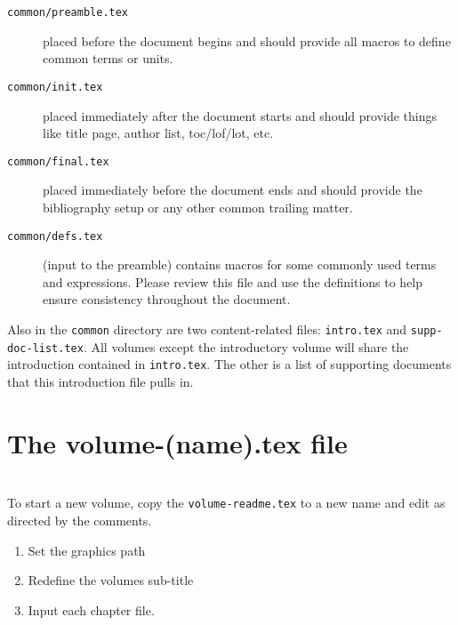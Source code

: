\begin{description}
\item[\texttt{common/preamble.tex}] placed before the document begins and should provide all macros to define common terms or units.
\item[\texttt{common/init.tex}] placed immediately after the document starts and should provide things like title page, author list, toc/lof/lot, etc.
\item[\texttt{common/final.tex}] placed immediately before the document ends and should provide the bibliography setup or any other common trailing matter.
\item[\texttt{common/defs.tex}] (input to the preamble) contains macros for some commonly 
used terms and expressions. Please review this file and use the definitions to help ensure consistency
throughout the document.
\end{description}

Also in the \texttt{common} directory are two content-related files: \texttt{intro.tex} and 
\texttt{supp-doc-list.tex}.  All volumes except the introductory volume will share the introduction
contained in \texttt{intro.tex}.  The other is a list of supporting documents that this
introduction file pulls in.

\section{The volume-(name).tex file}

 \\

To start a new volume, copy the \texttt{volume-readme.tex} to a new
name and edit as directed by the comments.  

\begin{enumerate}
\item Set the graphics path
\item Redefine the volumes sub-title
\item Input each chapter file.
\end{enumerate}


